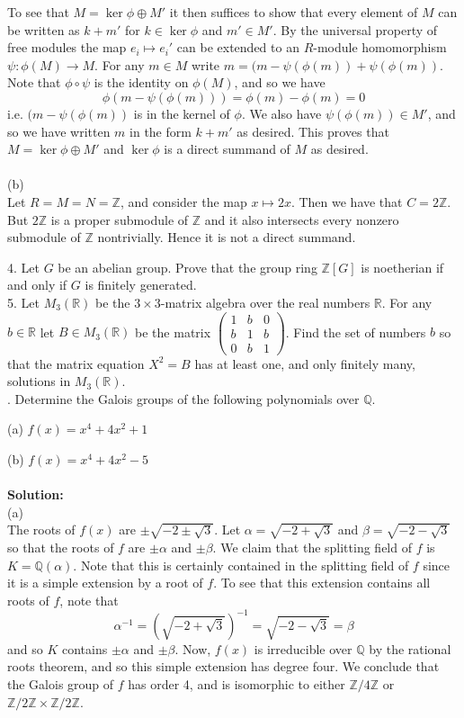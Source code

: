 \documentclass[11pt]{article}
\newcommand{\Z}{\mathbb{Z}}
\newcommand{\Q}{\mathbb{Q}}
\newcommand{\R}{\mathbb{R}}
\begin{document}
To see that $M =\ker\phi \oplus M'$ it then suffices to show that every element of $M$ can be written as $k+m'$ for $k\in \ker\phi$ and $m'\in M'$. By the universal property of free modules the map $e_i\mapsto e_i'$ can be extended to an $R$-module homomorphism $\psi:\phi(M)\to M$. For any $m\in M$ write $m = (m-\psi(\phi(m)) + \psi(\phi(m))$. Note that $\phi\circ \psi$ is the identity on $\phi(M)$, and so we have \[
\phi(m-\psi(\phi(m))) = \phi(m) - \phi(m) = 0
\]
i.e. $(m-\psi(\phi(m))$ is in the kernel of $\phi$. We also have $\psi(\phi(m)) \in M'$, and so we have written $m$ in the form $k+m'$ as desired. This proves that $M = \ker \phi \oplus M'$ and $\ker\phi$ is a direct summand of $M$ as desired.\\\\
(b)\\
Let $R = M = N = \Z$, and consider the map $x\mapsto 2x$. Then we have that $C = 2\Z$. But $2\Z$ is a proper submodule of $\Z$ and it also intersects every nonzero submodule of $\Z$ nontrivially. Hence it is not a direct summand.


\newpage

4. Let $G$ be an abelian group. Prove that the group ring $\Z[G]$ is noetherian if and only if $G$ is finitely
generated.\\

5. Let $M_3(\R)$ be the $3\times 3$-matrix algebra over the real numbers $\R$. For any $b\in \R$ let $B\in M_3(\R)$ be the matrix $\begin{pmatrix}1&b&0\\b&1&b\\0&b&1\end{pmatrix}$. Find the set of numbers $b$ so that the matrix equation $X^2 = B$ has at least one, and only finitely many, solutions in $M_3(\R)$. \\
. Determine the Galois groups of the following polynomials over $\Q$.

(a) $f(x) = x^4+4x^2+1$

(b) $f(x) = x^4 +4x^2 -5$\\\\
\textbf{Solution:}\\
(a)\\
 The roots of $f(x)$ are $\pm \sqrt{-2\pm \sqrt{3}}$. Let $\alpha = \sqrt{-2+\sqrt{3}}$ and $\beta = \sqrt{-2-\sqrt{3}}$ so that the roots of $f$ are $\pm \alpha$ and $\pm \beta$. We claim that the splitting field of $f$ is $K = \Q(\alpha)$. Note that this is certainly contained in the splitting field of $f$ since it is a simple extension by a root of $f$. To see that this extension contains all roots of $f$, note that  \[
\alpha^{-1} = \left(\sqrt{-2+\sqrt{3}}\right)^{-1} = \sqrt{-2-\sqrt{3}} = \beta
\]
and so $K$ contains $\pm\alpha$ and $\pm \beta$. Now, $f(x)$ is irreducible over $\Q$ by the rational roots theorem, and so this simple extension has degree four. We conclude that the Galois group of $f$ has order 4, and is isomorphic to either $\Z/4\Z$ or $\Z/2\Z \times \Z/2\Z$. 
\end{document}
